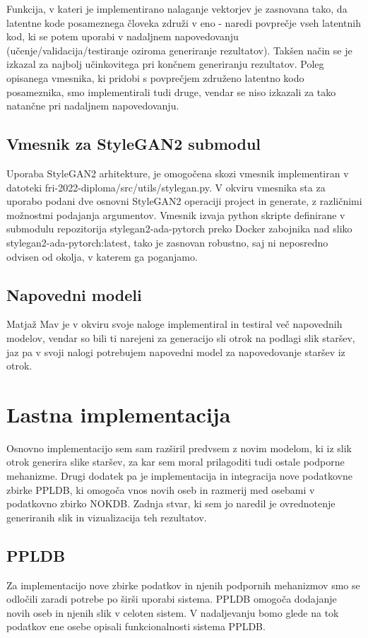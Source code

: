 \documentclass[a4paper,12pt,openright]{book}
\begin{document}
Funkcija, v kateri je implementirano nalaganje vektorjev je zasnovana tako, da latentne kode posameznega človeka združi v eno - naredi povprečje vseh latentnih kod, ki se potem uporabi v nadaljnem napovedovanju (učenje/validacija/testiranje oziroma generiranje rezultatov). Takšen način se je izkazal za najbolj učinkovitega pri končnem generiranju rezultatov. Poleg opisanega vmesnika, ki pridobi s povprečjem združeno latentno kodo posameznika, smo implementirali tudi druge, vendar se niso izkazali za tako natančne pri nadaljnem napovedovanju.  




\subsection{Vmesnik za StyleGAN2 submodul}
Uporaba StyleGAN2 arhitekture, je omogočena skozi vmesnik implementiran v datoteki fri-2022-diploma/src/utils/stylegan.py. V okviru vmesnika sta za uporabo podani dve osnovni StyleGAN2 operaciji project in generate, z različnimi možnostmi podajanja argumentov. Vmesnik izvaja python skripte definirane v submodulu repozitorija stylegan2-ada-pytorch \cite{stylegan2adapytorch} preko Docker zabojnika nad sliko stylegan2-ada-pytorch:latest, tako je zasnovan robustno, saj ni neposredno odvisen od okolja, v katerem ga poganjamo.

\subsection{Napovedni modeli}
Matjaž Mav je v okviru svoje naloge implementiral in testiral več napovednih modelov, vendar so bili ti narejeni za generacijo sli otrok na podlagi slik staršev, jaz pa v svoji nalogi potrebujem napovedni model za napovedovanje staršev iz otrok. 

\section{Lastna implementacija}
Osnovno implementacijo sem sam razširil predvsem z novim modelom, ki iz slik otrok generira slike staršev, za kar sem moral prilagoditi tudi ostale podporne mehanizme. 
Drugi dodatek pa je implementacija in integracija nove podatkovne zbirke PPLDB, ki omogoča vnos novih oseb in razmerij med osebami v podatkovno zbirko NOKDB. Zadnja stvar, ki sem jo naredil je ovrednotenje generiranih slik in vizualizacija teh rezultatov.

\subsection{PPLDB}
Za implementacijo nove zbirke podatkov in njenih podpornih mehanizmov smo se odločili zaradi potrebe po širši uporabi sistema. PPLDB omogoča dodajanje novih oseb in njenih slik v celoten sistem. V nadaljevanju bomo glede na tok podatkov ene osebe opisali funkcionalnosti sistema PPLDB.
\end{document}
